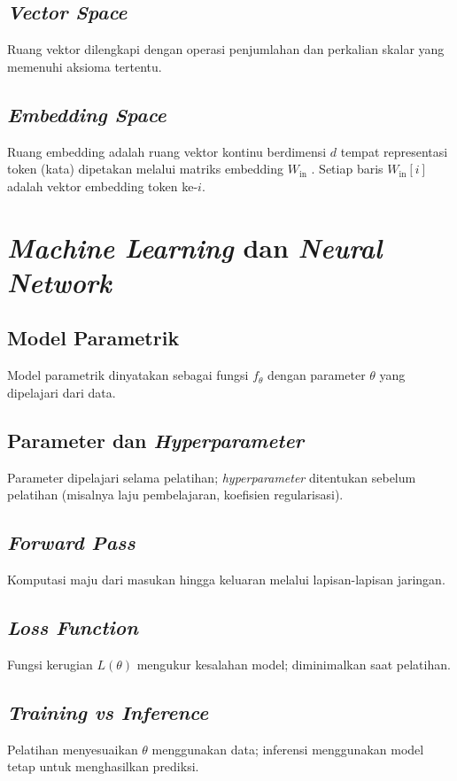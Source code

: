 \subsection{\textit{Vector Space}}
Ruang vektor dilengkapi dengan operasi penjumlahan dan perkalian skalar yang memenuhi aksioma tertentu.

\subsection{\textit{Embedding Space}}
Ruang embedding adalah ruang vektor kontinu berdimensi \(d\) tempat representasi token (kata) dipetakan melalui matriks embedding \(W_{\mathrm{in}}\) \citep{mikolov2013}. Setiap baris \(W_{\mathrm{in}}[i]\) adalah vektor embedding token ke-\(i\).

\section{\textit{Machine Learning} dan \textit{Neural Network}}

\subsection{Model Parametrik}
Model parametrik dinyatakan sebagai fungsi \(f_\theta\) dengan parameter \(\theta\) yang dipelajari dari data.

\subsection{Parameter dan \textit{Hyperparameter}}
Parameter dipelajari selama pelatihan; \textit{hyperparameter} ditentukan sebelum pelatihan (misalnya laju pembelajaran, koefisien regularisasi).

\subsection{\textit{Forward Pass}}
Komputasi maju dari masukan hingga keluaran melalui lapisan-lapisan jaringan.

\subsection{\textit{Loss Function}}
Fungsi kerugian \(L(\theta)\) mengukur kesalahan model; diminimalkan saat pelatihan.

\subsection{\textit{Training vs Inference}}
Pelatihan menyesuaikan \(\theta\) menggunakan data; inferensi menggunakan model tetap untuk menghasilkan prediksi.

